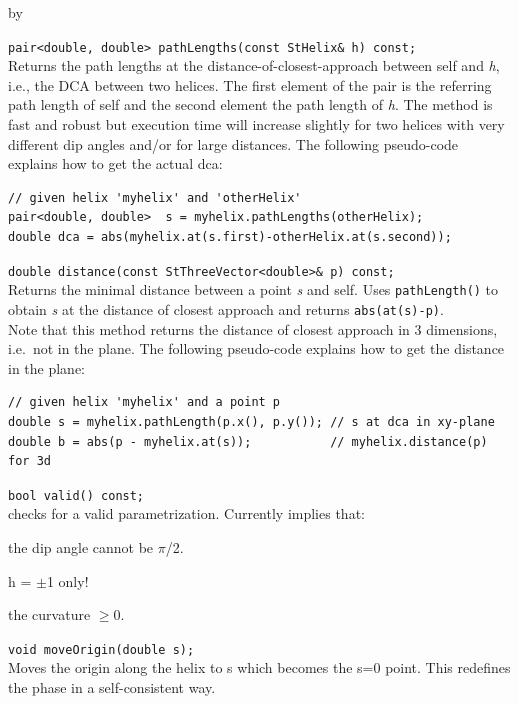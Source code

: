 \documentclass[twoside]{article}
\newcommand{\comp}[1]{\texttt{#1}}%
\newcommand{\args}[1]{\textit{#1}}%
\newcommand{\entrylabel}[1]{\mbox{\textbf{{#1}}}\hfil}%
\newenvironment{entry}
{\begin{list}{}%
    {\renewcommand{\makelabel}{\entrylabel}%
     \setlength{\labelwidth}{90pt}%
     \setlength{\leftmargin}{\labelwidth}
     \advance\leftmargin by \labelsep%
      }%
    }%
  {\end{list}}
\newcommand{\Entrylabel}[1]%
{\raisebox{0pt}[1ex][0pt]{\makebox[\labelwidth][l]%
    {\parbox[t]{\labelwidth}{\hspace{0pt}\textbf{{#1}}}}}}
\newenvironment{Entry}%
{\renewcommand{\entrylabel}{\Entrylabel}\begin{entry}}%
  {\end{entry}}
\begin{document}
\begin{description}
\begin{Entry}
     \verb+pair<double, double> pathLengths(const StHelix& h) const;+\\
     Returns the path lengths at the distance-of-closest-approach
       between self and
     \args{h}, i.e., the DCA between two helices.  The first element
     of the pair is the referring path length of self and the second
     element the path length of \args{h}.  The method is fast and
     robust but execution time will increase slightly for two helices
     with very different dip angles and/or for large distances.  The
     following pseudo-code explains how to get the actual dca:
    
    {\footnotesize
    \begin{verbatim}
// given helix 'myhelix' and 'otherHelix'
pair<double, double>  s = myhelix.pathLengths(otherHelix);
double dca = abs(myhelix.at(s.first)-otherHelix.at(s.second));
    \end{verbatim}
    }%

    \verb+double distance(const StThreeVector<double>& p) const;+\\
    Returns the minimal distance between a point \args{s} and self.
    Uses \comp{pathLength()} to obtain \args{s} at the distance of closest
    approach and returns \comp{abs(at(s)-p)}.\\
    Note that this method returns the distance of closest approach in 3 dimensions,
    i.e.~not in the plane. The following pseudo-code explains how to get the distance
    in the plane:
    
    {\footnotesize
    \begin{verbatim}
// given helix 'myhelix' and a point p
double s = myhelix.pathLength(p.x(), p.y()); // s at dca in xy-plane
double b = abs(p - myhelix.at(s));           // myhelix.distance(p) for 3d    
    \end{verbatim}
    }%

    \verb+bool valid() const;+\\
    checks for a valid parametrization.  Currently implies that:
    \begin{description}
      \item the dip angle cannot be $\pi$/2.
      \item h = $\pm$1 only!
      \item the curvature $\geq$0.
    \end{description}

    \verb+void moveOrigin(double s);+\\
    Moves the origin along the helix to s which becomes the
    s=0 point.  This redefines the phase in a self-consistent way.
    

\end{Entry}
\end{description}
\end{document}
